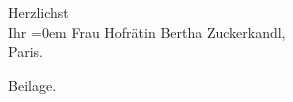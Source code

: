 \pstart
           Herzlichst{\\[\baselineskip]} Ihr\pend
           \leftskip=0em{}{\vspace{1\baselineskip}}
\pstart
           \noindent{}Frau Hofrätin Bertha Zuckerkandl,{\\}Paris.\pend
           
 Beilage.\pend
           \endnumbering{}
\begin{anhang}
\end{anhang}\newcommand{\dateiname}{L03956}\newcommand{\titel}{Arthur Schnitzler an Berta Zuckerkandl, 1. 12. 1924}\newcommand{\editorInnen}{Herausgegeben von Jahnke, SelmaMüller, Martin Anton}

